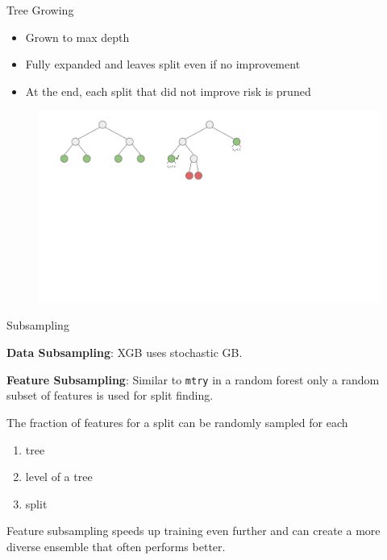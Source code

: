 \documentclass[11pt,compress,t,notes=noshow, xcolor=table]{beamer}
\begin{document}
\begin{vbframe}{Tree Growing}

  \begin{itemize}
    \item Grown to max depth 
    \item Fully expanded and leaves split even if no improvement
    \item At the end, each split that did not improve risk is pruned
  \end{itemize}

  \lz

  \begin{figure}
    \includegraphics[trim=0 260 230 20, clip, width=\textwidth,page=2]{figure_man/trees_balance.pdf}
  \end{figure}


\end{vbframe}

\begin{vbframe}{Subsampling}

  \textbf{Data Subsampling}: XGB uses stochastic GB.

  \lz

  \textbf{Feature Subsampling}: Similar to \texttt{mtry} in a random forest only a random subset of features is used for split finding.

  \lz

  The fraction of features for a split can be randomly sampled for each
  \begin{enumerate}
    \item tree
    \item level of a tree
    \item split
  \end{enumerate}

  \lz

 Feature subsampling speeds up training even further and can create a more diverse ensemble that often performs better.


\end{vbframe}
\end{document}
